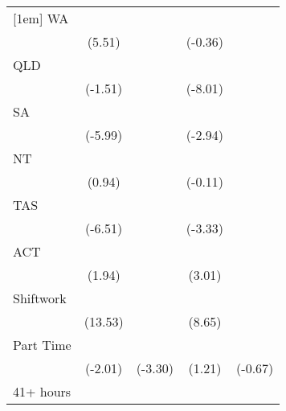 {\begin{tabular}{l*{4}{c}}
[1em]
WA                  &            \sym{***}&                     &                     &                     \\
                    &      (5.51)         &                     &     (-0.36)         &                     \\
[1em]
QLD                 &                     &                     &            \sym{***}&                     \\
                    &     (-1.51)         &                     &     (-8.01)         &                     \\
[1em]
SA                  &            \sym{***}&                     &            \sym{**} &                     \\
                    &     (-5.99)         &                     &     (-2.94)         &                     \\
[1em]
NT                  &                     &                     &                     &                     \\
                    &      (0.94)         &                     &     (-0.11)         &                     \\
[1em]
TAS                 &            \sym{***}&                     &            \sym{***}&                     \\
                    &     (-6.51)         &                     &     (-3.33)         &                     \\
[1em]
ACT                 &                     &                     &            \sym{**} &                     \\
                    &      (1.94)         &                     &      (3.01)         &                     \\
[1em]
Shiftwork           &            \sym{***}&                     &            \sym{***}&                     \\
                    &     (13.53)         &                     &      (8.65)         &                     \\
[1em]
Part Time           &            \sym{*}  &            \sym{***}&                     &                     \\
                    &     (-2.01)         &     (-3.30)         &      (1.21)         &     (-0.67)         \\
[1em]
41+ hours           &                     &                     &            \sym{***}&                     \\

\end{tabular}}
